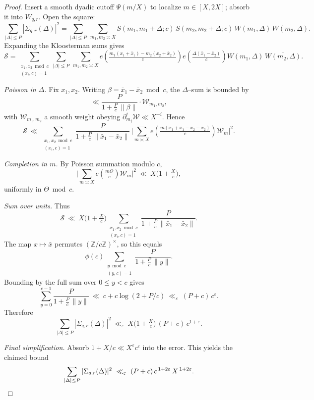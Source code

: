 \documentclass[11pt]{article}
\theoremstyle{definition}
\theoremstyle{remark}
\numberwithin{equation}{part}
\begin{document}
\begin{proof}
	Insert a smooth dyadic cutoff $\Psi(m/X)$ to localize $m\in[X,2X]$; absorb it into $W_{q,r}$.
	Open the square:
	\[
		\sum_{|\Delta|\le P}|\Sigma_{q,r}(\Delta)|^2
		=\!\!\sum_{|\Delta|\le P}\ \sum_{m_1,m_2\asymp X}
		S(m_1,m_1+\Delta;c)\,\overline{S(m_2,m_2+\Delta;c)}\,
		W(m_1,\Delta)\,\overline{W(m_2,\Delta)}.
	\]
	Expanding the Kloosterman sums gives
	\[
		\mathcal S
		=\!\!\sum_{\substack{x_1,x_2\bmod c\\(x_i,c)=1}}
		\sum_{|\Delta|\le P}\ \sum_{m_1,m_2\asymp X}
		e\!\left(\tfrac{m_1(x_1+\bar x_1)-m_2(x_2+\bar x_2)}{c}\right)
		e\!\left(\tfrac{\Delta(\bar x_1-\bar x_2)}{c}\right)
		W(m_1,\Delta)\,\overline{W(m_2,\Delta)}.
	\]

	\emph{Poisson in $\Delta$.} Fix $x_1,x_2$. Writing $\beta=\bar x_1-\bar x_2\bmod c$,
	the $\Delta$--sum is bounded by
	\[
		\ll \frac{P}{1+\tfrac{P}{c}\,\|\beta\|}\cdot \mathcal W_{m_1,m_2},
	\]
	with $\mathcal W_{m_1,m_2}$ a smooth weight obeying $\partial_{m_j}^i\mathcal W\ll X^{-i}$.
	Hence
	\[
		\mathcal S\ \ll\ \sum_{\substack{x_1,x_2\bmod c\\(x_i,c)=1}}
		\frac{P}{1+\tfrac{P}{c}\,\|\bar x_1-\bar x_2\|}\,
		\Bigg|\sum_{m\asymp X}
		e\!\left(\tfrac{m(x_1+\bar x_1-x_2-\bar x_2)}{c}\right)\mathcal W_m\Bigg|^2.
	\]

	\emph{Completion in $m$.} By Poisson summation modulo $c$,
	\[
		\Bigg|\sum_{m\asymp X} e\!\left(\tfrac{m\Theta}{c}\right)\mathcal W_m\Bigg|^2
		\ \ll\ X\Big(1+\tfrac{X}{c}\Big),
	\]
	uniformly in $\Theta\bmod c$.

	\emph{Sum over units.} Thus
	\[
		\mathcal S\ \ll\ X\Big(1+\tfrac{X}{c}\Big)
		\sum_{\substack{x_1,x_2\bmod c\\(x_i,c)=1}}
		\frac{P}{1+\tfrac{P}{c}\,\|\bar x_1-\bar x_2\|}.
	\]
	The map $x\mapsto \bar x$ permutes $(\mathbb Z/c\mathbb Z)^\times$, so this equals
	\[
		\phi(c)\sum_{\substack{y\bmod c\\(y,c)=1}}\frac{P}{1+\tfrac{P}{c}\,\|y\|}.
	\]
	Bounding by the full sum over $0\le y<c$ gives
	\[
		\sum_{y=0}^{c-1}\frac{P}{1+\tfrac{P}{c}\,\|y\|}
		\ \ll\ c+\!c\log(2+P/c)
		\ \ll_{\varepsilon}\ (P+c)\,c^{\varepsilon}.
	\]
	Therefore
	\[
		\sum_{|\Delta|\le P}|\Sigma_{q,r}(\Delta)|^2
		\ \ll_{\varepsilon}\ X\Big(1+\tfrac{X}{c}\Big)\,(P+c)\,c^{1+\varepsilon}.
	\]

	\emph{Final simplification.} Absorb $1+X/c\ll X^{\varepsilon}c^{\varepsilon}$ into the error.
	This yields the claimed bound
	\[
		\sum_{|\Delta|\le P}|\Sigma_{q,r}(\Delta)|^2
		\ \ll_{\varepsilon}\ (P+c)\,c^{\,1+2\varepsilon}\,X^{\,1+2\varepsilon}.
		\qedhere
	\]
\end{proof}
\end{document}
